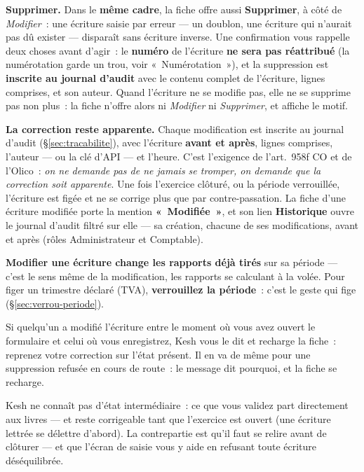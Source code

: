 \documentclass[a4paper,11pt,oneside]{article}
\begin{document}
\textbf{Supprimer.} Dans le \textbf{même cadre}, la fiche offre aussi \textbf{Supprimer}, à
côté de \emph{Modifier}~: une écriture saisie par erreur --- un doublon, une écriture qui
n'aurait pas dû exister --- disparaît sans écriture inverse. Une confirmation vous rappelle
deux choses avant d'agir~: le \textbf{numéro} de l'écriture \textbf{ne sera pas réattribué}
(la numérotation garde un trou, voir «~Numérotation~»), et la suppression est \textbf{inscrite au
journal d'audit} avec le contenu complet de l'écriture, lignes comprises, et son auteur. Quand
l'écriture ne se modifie pas, elle ne se supprime pas non plus~: la fiche n'offre alors ni
\emph{Modifier} ni \emph{Supprimer}, et affiche le motif.

\textbf{La correction reste apparente.} Chaque modification est inscrite au journal
d'audit (\S\ref{sec:tracabilite}), avec l'écriture \textbf{avant et après}, lignes
comprises, l'auteur --- ou la clé d'API --- et l'heure. C'est l'exigence de l'art.~958f CO
et de l'Olico~: \emph{on ne demande pas de ne jamais se tromper, on demande que la
correction soit apparente}. Une fois l'exercice clôturé, ou la période verrouillée,
l'écriture est figée et ne se corrige plus que par contre-passation. La fiche d'une écriture
modifiée porte la mention \textbf{«~Modifiée~»}, et son lien \textbf{Historique} ouvre le
journal d'audit filtré sur elle --- sa création, chacune de ses modifications, avant et après
(rôles Administrateur et Comptable).

\begin{keshwarning}
\textbf{Modifier une écriture change les rapports déjà tirés} sur sa période --- c'est le
sens même de la modification, les rapports se calculant à la volée. Pour figer un trimestre
déclaré (TVA), \textbf{verrouillez la période}~: c'est le geste qui fige
(\S\ref{sec:verrou-periode}).
\end{keshwarning}

\begin{keshnote}
Si quelqu'un a modifié l'écriture entre le moment où vous avez ouvert le formulaire et
celui où vous enregistrez, Kesh vous le dit et recharge la fiche~: reprenez votre
correction sur l'état présent. Il en va de même pour une suppression refusée en cours de
route~: le message dit pourquoi, et la fiche se recharge.
\end{keshnote}

\begin{keshtip}[title=\faLightbulb\ Pourquoi il n'y a pas de «~brouillon~»]
Kesh ne connaît pas d'état intermédiaire~: ce que vous validez part directement aux livres
--- et reste corrigeable tant que l'exercice est ouvert (une écriture lettrée se délettre
d'abord). La contrepartie est qu'il faut se
relire avant de clôturer --- et que l'écran de saisie vous y aide en refusant toute
écriture déséquilibrée.
\end{keshtip}
\end{document}
